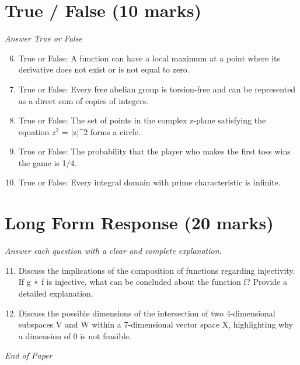 \documentclass[12pt]{article}
\begin{document}
\section*{True / False (10 marks)}
\textit{Answer True or False}
\begin{enumerate}[label=\arabic*.]
\setcounter{enumi}{5}
\item True or False: A function can have a local maximum at a point where its derivative does not exist or is not equal to zero.
\item True or False: Every free abelian group is torsion-free and can be represented as a direct sum of copies of integers.
\item True or False: The set of points in the complex z-plane satisfying the equation $z^2$ = |z|^2 forms a circle.
\item True or False: The probability that the player who makes the first toss wins the game is 1/4.
\item True or False: Every integral domain with prime characteristic is infinite.
\end{enumerate}

\section*{Long Form Response (20 marks)}
\textit{Answer each question with a clear and complete explanation.}
\begin{enumerate}[label=\arabic*.]
\setcounter{enumi}{10}
\item Discuss the implications of the composition of functions regarding injectivity. If g ∘ f is injective, what can be concluded about the function f? Provide a detailed explanation.
\item Discuss the possible dimensions of the intersection of two 4-dimensional subspaces V and W within a 7-dimensional vector space X, highlighting why a dimension of 0 is not feasible.
\end{enumerate}

\vfill
\noindent\textit{End of Paper}
\end{document}
